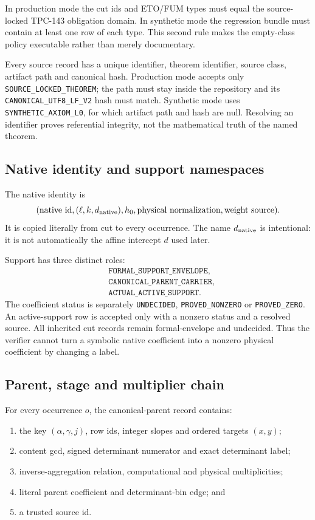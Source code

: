 \documentclass[11pt]{article}
\numberwithin{equation}{section}
\theoremstyle{definition}
\theoremstyle{remark}
\begin{document}
In production mode the cut ids and ETO/FUM types must equal the
source-locked TPC-143 obligation domain.  In synthetic mode the
regression bundle must contain at least one row of each type.  This
second rule makes the empty-class policy executable rather than
merely documentary.

Every source record has a unique identifier, theorem identifier,
source class, artifact path and canonical hash.  Production mode
accepts only \texttt{SOURCE\_LOCKED\_THEOREM}; the path must stay
inside the repository and its
\texttt{CANONICAL\_UTF8\_LF\_V2} hash must match.  Synthetic mode uses
\texttt{SYNTHETIC\_AXIOM\_L0}, for which artifact path and hash are
null.  Resolving an identifier proves referential integrity, not the
mathematical truth of the named theorem.

\subsection{Native identity and support namespaces}

The native identity is
\[
 (\text{native id},(\ell,k,d_{\rm native}),h_0,
   \text{physical normalization},\text{weight source}).
\]
It is copied literally from cut to every occurrence.  The name
\(d_{\rm native}\) is intentional: it is not automatically the affine
intercept \(d\) used later.

Support has three distinct roles:
\[
\begin{split}
 &\texttt{FORMAL\_SUPPORT\_ENVELOPE},\\
 &\texttt{CANONICAL\_PARENT\_CARRIER},\\
 &\texttt{ACTUAL\_ACTIVE\_SUPPORT}.
\end{split}
\]
The coefficient status is separately
\texttt{UNDECIDED}, \texttt{PROVED\_NONZERO} or
\texttt{PROVED\_ZERO}.  An active-support row is accepted only with a
nonzero status and a resolved source.  All inherited cut records
remain formal-envelope and undecided.  Thus the verifier cannot turn
a symbolic native coefficient into a nonzero physical coefficient by
changing a label.

\subsection{Parent, stage and multiplier chain}

For every occurrence \(o\), the canonical-parent record contains:
\begin{enumerate}[label=(\roman*),leftmargin=2.2em]
\item the key \((\alpha,\gamma,j)\), row ids, integer slopes and
  ordered targets \((x,y)\);
\item content gcd, signed determinant numerator and exact determinant
  label;
\item inverse-aggregation relation, computational and physical
  multiplicities;
\item literal parent coefficient and determinant-bin edge; and
\item a trusted source id.
\end{enumerate}
\end{document}
